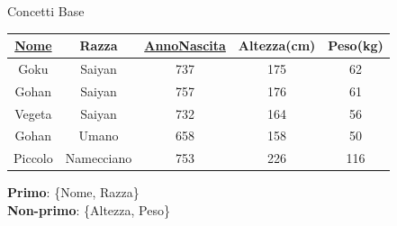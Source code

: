 \begin{frame}{Concetti Base}
\begin{table}[h]
    \centering
    \begin{tabular}{|c|c|c|c|c|}
        \hline
        \rowcolor{cyan!30} \textbf{\underline{Nome}} & \textbf{Razza} & \textbf{\underline{AnnoNascita}} & \textbf{Altezza(cm)} & \textbf{Peso(kg)} \\ \hline
        Goku & Saiyan & 737 & 175 & 62 \\ \hline
        Gohan & Saiyan & 757 & 176 & 61 \\ \hline
        Vegeta & Saiyan & 732 & 164 & 56 \\ \hline
        Gohan & Umano & 658 & 158 & 50 \\ \hline
        Piccolo & Namecciano & 753 & 226 & 116 \\ \hline
    \end{tabular}
\end{table}
\vspace{0.2cm}

\textbf{Primo}: \{Nome, Razza\}\\
\textbf{Non-primo}: \{Altezza, Peso\}
\end{frame}
%
